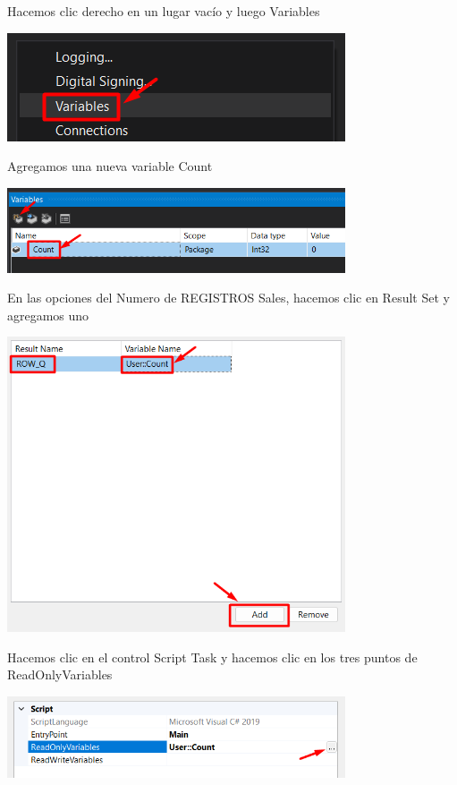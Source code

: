 \documentclass[12pt,letterpaper]{article}
\begin{document}
Hacemos clic derecho en un lugar vacío y luego Variables

\begin{center}
    \includegraphics[width=10cm]{./img/img23.png}
\end{center}

Agregamos una nueva variable Count

\begin{center}
    \includegraphics[width=10cm]{./img/img24.png}
\end{center}

En las opciones del Numero de REGISTROS Sales, hacemos clic en Result Set y agregamos uno

\begin{center}
    \includegraphics[width=10cm]{./img/img25.png}
\end{center}

Hacemos clic en el control Script Task y hacemos clic en los tres puntos de ReadOnlyVariables

\begin{center}
    \includegraphics[width=10cm]{./img/img26.png}
\end{center}
\end{document}
